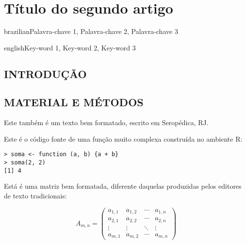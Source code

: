 \artigotrue
\chapter{Título do segundo artigo}
\label{chap:chapter01}

\begin{chapterabstract}{brazilian}{Palavra-chave 1, Palavra-chave 2, Palavra-chave 3}
\end{chapterabstract}

\begin{chapterabstract}{english}{Key-word 1, Key-word 2, Key-word 3}
\end{chapterabstract}

\formatchapter

\section{INTRODUÇÃO}

\blindtext[2]

\section{MATERIAL E MÉTODOS}

Este também é um texto bem formatado, escrito em Seropédica, RJ. \blindtext[1]

Este é o código fonte de uma função muito complexa construída no ambiente R:

\begin{verbatim}
> soma <- function (a, b) {a + b}
> soma(2, 2)
[1] 4
\end{verbatim}

Está é uma matriz bem formatada, diferente daquelas produzidas pelos editores de
texto tradicionais:

\begin{equation}
  A_{m,n} =
 \begin{pmatrix}
  a_{1,1} & a_{1,2} & \cdots & a_{1,n} \\
  a_{2,1} & a_{2,2} & \cdots & a_{2,n} \\
  \vdots  & \vdots  & \ddots & \vdots  \\
  a_{m,1} & a_{m,2} & \cdots & a_{m,n}
 \end{pmatrix}
\end{equation}


